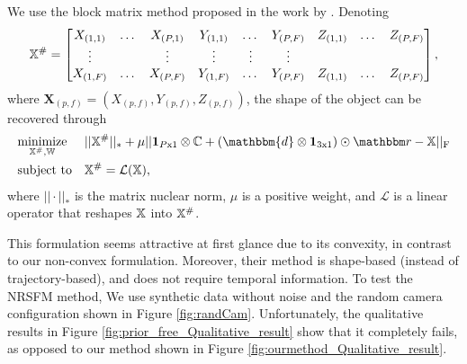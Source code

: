 We use the block matrix method proposed in the work by \citet{dai2014simple}. Denoting
\begin{equation}
\mathbb X^\# = 
\begin{bmatrix}
X_{(1,1)}& \dots& X_{(P,1)} & Y_{(1,1)}& \dots& Y_{(P,F)} & Z_{(1,1)}& \dots& Z_{(P,F)} \\
\vdots   &  				& \vdots   & \vdots 		  & \vdots   & \vdots			  \\
X_{(1,F)}& \dots& X_{(P,F)} & Y_{(1,F)}& \dots& Y_{(P,F)} & Z_{(1,1)}& \dots& Z_{(P,F)}\nonumber		  
\end{bmatrix},
\end{equation}
where $\mathbf{X}_{(p,f)} = (X_{(p,f)},Y_{(p,f)},Z_{(p,f)})$, the shape of the object can be recovered through 
\begin{equation}
\begin{aligned}
& \underset{\allX^\#, \allT}{\text{minimize}} &&
||\allX^\#||_* + \mu ||\mathbf{1}_{P\text{x}1} \otimes \allC + (\mathbbm{d} \otimes \mathbf{1}_{3\text{x}1}) \odot \allr - \allX||_{\text{F}}\\
&\text{subject to} && \allX^\# = \mathcal{L}(\allX), \nonumber
\end{aligned}
\end{equation}
where $||\cdot||_*$ is the matrix nuclear norm, $\mu$ is a positive weight, and $\mathcal{L}$ is a linear operator that reshapes $\mathbb X$ into $\mathbb X^\#$. 

This formulation seems attractive at first glance due to its convexity, in contrast to our non-convex formulation. Moreover, their method is shape-based (instead of trajectory-based), and does not require temporal information. 
To test the NRSFM method, We use synthetic data without noise and the random camera configuration shown in Figure \ref{fig:randCam}.
Unfortunately, the qualitative results in Figure \ref{fig:prior_free_Qualitative_result} show that it completely fails, as opposed to our method shown in Figure \ref{fig:ourmethod_Qualitative_result}. 


